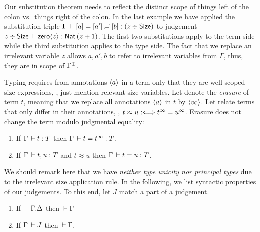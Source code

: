 \documentclass[acmsmall,screen]{acmart}\settopmatter{}
\begin{document}
Our substitution theorem
needs to reflect the distinct scope of things left of the colon vs.\
things right of the colon.  In the last example we have applied the
substitution triple $\Gamma \,\vdash [a] = [a'] \risingdotseq [b] : (z \div \mathsf{Size})$
to judgement $z \div \mathsf{Size} \,\vdash \mathsf{zero}\langle z\rangle : \mathsf{Nat}\, (z + 1)$.
The first two substitutions apply to the term side while the third
substitution applies to the type side.  The fact that we replace an
irrelevant variable $z$ allows $a,a',b$ to refer to irrelevant
variables from $\Gamma$, thus, they are in scope of $\resurrect\Gamma$.

Typing requires from annotations $\langle a\rangle$ in a term only that they are well-scoped size expressions, \ie, just mention relevant size variables.  Let  denote the \emph{erasure} of term $t$, meaning that we replace all annotations $\langle a\rangle$ in $t$ by $\langle\infty\rangle$.  Let  relate terms that only differ in their annotations, \ie, $t \approx u \mathrel{:\Longleftrightarrow} t^\infty = u^\infty$.
Erasure does not change the term modulo judgmental equality:
\begin{lemma}
\label{lem:erase}
\bla
\begin{enumerate}
\item If\/ $\Gamma \,\vdash t : T$ then $\Gamma \,\vdash t = t^\infty : T$.
\item If\/ $\Gamma \,\vdash t, u : T$ and $t \approx u$ then $\Gamma \,\vdash t = u : T$.
\end{enumerate}
\end{lemma}



\noindent
We should remark here that we have \emph{neither type unicity nor principal types}
due to the irrelevant size application rule.
In the following, we list syntactic properties of our judgements.  To
this end, let $J$ %
match a part of a judgement.

\begin{lemma}
\label{lem:cxtwf}\bla
  \begin{enumerate}
  \item If\/ $\,\vdash \Gamma. \Delta$ then $\,\vdash \Gamma$
  \item If\/ $\Gamma \,\vdash J$ then $\,\vdash \Gamma$.
  \end{enumerate}
\end{lemma}
\end{document}
